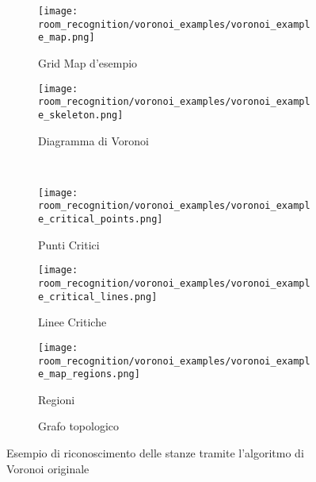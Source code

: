 \begin{figure}[H]
  \centering
  \begin{subfigure}[t]{0.45\textwidth}
    \centering
    \texttt{[image: room\_recognition/voronoi\_examples/voronoi\_example\_map.png]}
    \caption{Grid Map d'esempio}
  \end{subfigure}
  \hfill
  \begin{subfigure}[t]{0.45\textwidth}
    \centering
    \texttt{[image: room\_recognition/voronoi\_examples/voronoi\_example\_skeleton.png]}
    \caption{Diagramma di Voronoi}
  \end{subfigure}\\
  \begin{subfigure}[t]{0.45\textwidth}
    \centering
    \texttt{[image: room\_recognition/voronoi\_examples/voronoi\_example\_critical\_points.png]}
    \caption{Punti Critici}
  \end{subfigure}
  \hfill
  \begin{subfigure}[t]{0.45\textwidth}
    \centering
    \texttt{[image: room\_recognition/voronoi\_examples/voronoi\_example\_critical\_lines.png]}
    \caption{Linee Critiche}
  \end{subfigure}
  \begin{subfigure}[t]{0.45\textwidth}
    \centering
    \texttt{[image: room\_recognition/voronoi\_examples/voronoi\_example\_map\_regions.png]}
    \caption{Regioni}
  \end{subfigure}
  \hfill
  \begin{subfigure}[t]{0.45\textwidth}
    \centering

    \caption{Grafo topologico}
  \end{subfigure}
  \caption{Esempio di riconoscimento delle stanze tramite l'algoritmo di Voronoi originale \cite{thrun}}
\end{figure}

